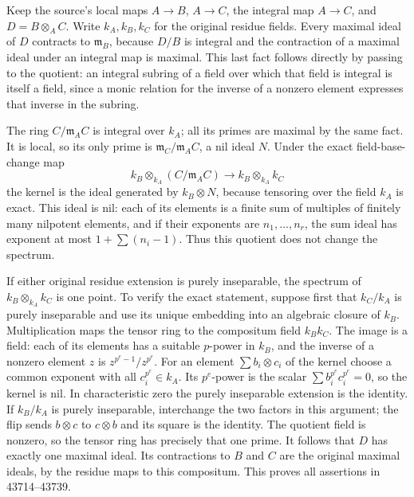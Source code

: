 Keep the source's local maps \(A\to B\), \(A\to C\), the integral map \(A\to C\), and \(D=B\otimes_A C\). Write \(k_A,k_B,k_C\) for the original residue fields. Every maximal ideal of \(D\) contracts to \(\mathfrak m_B\), because \(D/B\) is integral and the contraction of a maximal ideal under an integral map is maximal. This last fact follows directly by passing to the quotient: an integral subring of a field over which that field is integral is itself a field, since a monic relation for the inverse of a nonzero element expresses that inverse in the subring.

The ring \(C/\mathfrak m_A C\) is integral over \(k_A\); all its primes are maximal by the same fact. It is local, so its only prime is \(\mathfrak m_C/\mathfrak m_A C\), a nil ideal \(N\). Under the exact field-base-change map \[
 k_B\otimes_{k_A}(C/\mathfrak m_A C)\longrightarrow k_B\otimes_{k_A}k_C
\] the kernel is the ideal generated by \(k_B\otimes N\), because tensoring over the field \(k_A\) is exact. This ideal is nil: each of its elements is a finite sum of multiples of finitely many nilpotent elements, and if their exponents are \(n_1,\ldots,n_r\), the sum ideal has exponent at most \(1+\sum(n_i-1)\). Thus this quotient does not change the spectrum.

If either original residue extension is purely inseparable, the spectrum of \(k_B\otimes_{k_A}k_C\) is one point. To verify the exact statement, suppose first that \(k_C/k_A\) is purely inseparable and use its unique embedding into an algebraic closure of \(k_B\). Multiplication maps the tensor ring to the compositum field \(k_Bk_C\). The image is a field: each of its elements has a suitable \(p\)-power in \(k_B\), and the inverse of a nonzero element \(z\) is \(z^{p^e-1}/z^{p^e}\). For an element \(\sum b_i\otimes c_i\) of the kernel choose a common exponent with all \(c_i^{p^e}\in k_A\). Its \(p^e\)-power is the scalar \(\sum b_i^{p^e}c_i^{p^e}=0\), so the kernel is nil. In characteristic zero the purely inseparable extension is the identity. If \(k_B/k_A\) is purely inseparable, interchange the two factors in this argument; the flip sends \(b\otimes c\) to \(c\otimes b\) and its square is the identity. The quotient field is nonzero, so the tensor ring has precisely that one prime. It follows that \(D\) has exactly one maximal ideal. Its contractions to \(B\) and \(C\) are the original maximal ideals, by the residue maps to this compositum. This proves all assertions in 43714--43739.

